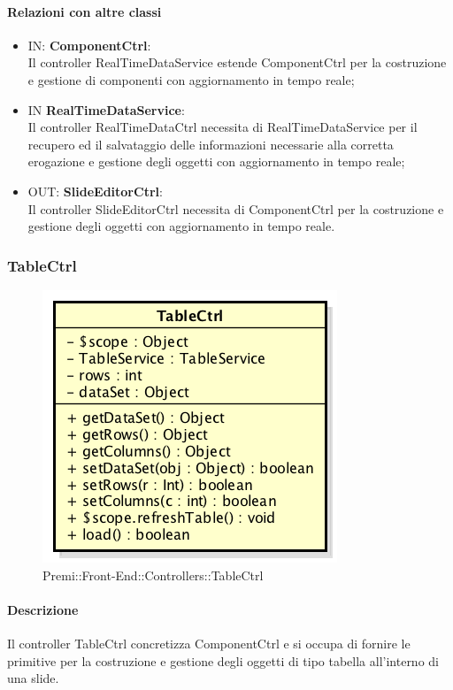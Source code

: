 	\paragraph{Relazioni con altre classi}
	\begin{itemize}
 	\item IN: \textbf{ComponentCtrl}:\\
	 	Il controller RealTimeDataService estende ComponentCtrl per la costruzione e gestione di componenti con aggiornamento in tempo reale;
	\item IN \textbf{RealTimeDataService}:\\
		Il controller RealTimeDataCtrl necessita di RealTimeDataService per il recupero ed il salvataggio delle informazioni necessarie alla corretta erogazione e gestione degli oggetti con aggiornamento in tempo reale;
	\item OUT: \textbf{SlideEditorCtrl}:\\
		Il controller SlideEditorCtrl necessita di ComponentCtrl per la costruzione e gestione degli oggetti con aggiornamento in tempo reale. 	
	\end{itemize}

\newpage
\subsubsection{TableCtrl}
\begin{figure}[h]
	\centering
	\includegraphics[width=0.4\linewidth]{img/premi_front_end_controllers_tablectrl}
	\caption[Premi::Front-End::Controllers::TableCtrl]{Premi::Front-End::Controllers::TableCtrl}
\end{figure}
   \paragraph{Descrizione}
	Il controller TableCtrl concretizza ComponentCtrl e si occupa di fornire le primitive per la costruzione e gestione degli oggetti di tipo tabella all'interno di una slide.
		
